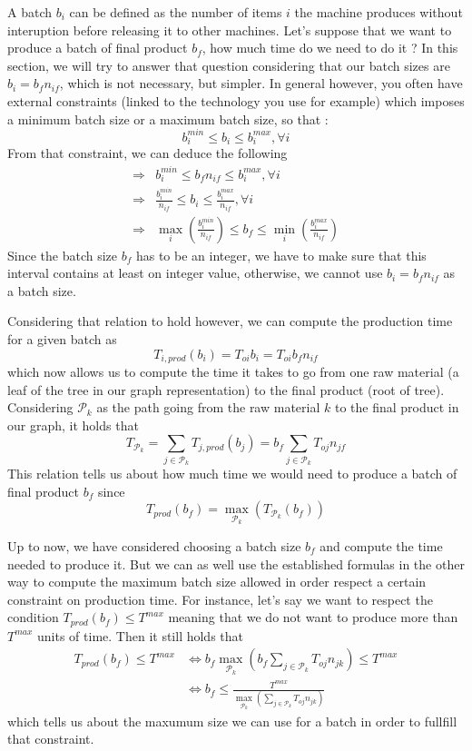 A batch $b_i$ can be defined as the number of items $i$ the machine produces without interuption before releasing it to other machines. Let's suppose that we want to produce a batch of final product $b_f$, how much time do we need to do it ? In this section, we will try to answer that question considering that our batch sizes are $b_i = b_fn_{if}$, which is not necessary, but simpler. In general however, you often have external constraints (linked to the technology you use for example) which imposes a minimum batch size or a maximum batch size, so that : 
\[ b_i^{min} \le b_i \le b_i^{max}, \forall i \]
From that constraint, we can deduce the following
\[
    \begin{split}
        \Rightarrow & b_i^{min} \le b_fn_{if} \le b_i^{max}, \forall i \\
        \Rightarrow & \frac{b_i^{min}}{n_{if}} \le b_i \le \frac{b_i^{max}}{n_{if}}, \forall i\\
        \Rightarrow & \max_i\left( \frac{b_i^{min}}{n_{if}} \right) \le b_f \le \min_i\left( \frac{b_i^{max}}{n_{if}} \right)
    \end{split}
\]
Since the batch size $b_f$ has to be an integer, we have to make sure that this interval contains at least on integer value, otherwise, we cannot use $b_i = b_fn_{if}$ as a batch size. 

Considering that relation to hold however, we can compute the production time for a given batch as \[ T_{i,prod}(b_i) = T_{oi}b_i = T_{oi}b_fn_{if} \] which now allows us to compute the time it takes to go from one raw material (a leaf of the tree in our graph representation) to the final product (root of tree). Considering $\mathcal P_k$ as the path going from the raw material $k$ to the final product in our graph, it holds that \[ T_{\mathcal P_k} = \sum_{j\in\mathcal P_k}T_{j,prod}(b_j) = b_f\sum_{j\in\mathcal P_k} T_{oj}n_{jf} \] This relation tells us about how much time we would need to produce a batch of final product $b_f$ since \[ T_{prod}(b_f) = \max_{\mathcal P_k}\left( T_{\mathcal P_k}(b_f) \right) \]

Up to now, we have considered choosing a batch size $b_f$ and compute the time needed to produce it. But we can as well use the established formulas in the other way to compute the maximum batch size allowed in order respect a certain constraint on production time. For instance, let's say we want to respect the condition $T_{prod}(b_f) \le T^{max}$ meaning that we do not want to produce more than $T^{max}$ units of time. Then it still holds that 
\[
    \begin{split}
        T_{prod}(b_f) \le T^{max}
            &\Leftrightarrow b_f\max_{\mathcal P_k}\left( b_f\sum_{j\in\mathcal P_k} T_{oj}n_{jk} \right) \le T^{max}\\
            &\Leftrightarrow b_f \le \frac{T^{max}}{ \max_{\mathcal P_k}\left( \sum_{j\in\mathcal P_k} T_{oj}n_{jk} \right) }
    \end{split}
\] which tells us about the maxumum size we can use for a batch in order to fullfill that constraint. 


